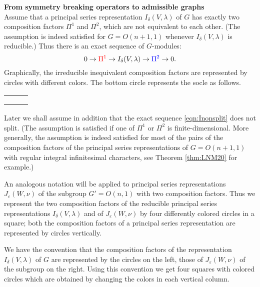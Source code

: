 \medskip
{\bf From symmetry breaking operators to admissible graphs} \\

Assume that a principal series representation $I_{\delta}(V,\lambda)$ of $G$
 has exactly two composition factors $\Pi^1$ and $\Pi^2$, 
 which are not equivalent to each other.  
(The assumption is indeed satisfied for $G=O(n+1,1)$
 whenever $I_{\delta}(V,\lambda)$ is reducible.)
Thus there is an exact sequence of $G$-modules: 
\begin{equation}
  0  \to  {\color{red}\Pi^1}  \to  I_{\delta}(V,\lambda)
     \to {\color{blue}\Pi^2}  \to 0.  
\label{eqn:Inonsplit}
\end{equation}
Graphically,
 the irreducible inequivalent composition factors are represented by circles with different colors. The bottom circle represents the socle
 as follows.  

\begin{center}
	\begin{tabular}{c@{\kern2em}c@{\kern2em}c} 
		\blueO  & &\\
		& &\\
		\redO  & & 
	\end{tabular}
\end{center}
Later we shall assume in addition
 that the exact sequence \eqref{eqn:Inonsplit} does not split. 
(The assumption is satisfied
 if one of $\Pi^1$ or $\Pi^2$ is finite-dimensional.  
More generally,
 the assumption is indeed satisfied 
 for most of the pairs of the composition factors
 of the principal series representations of $G=O(n+1,1)$
 with regular integral infinitesimal characters, 
 see Theorem \ref{thm:LNM20} for example.)


\medskip
An analogous notation will be applied to principal series representations
 $J_{\varepsilon}(W,\nu)$
 of the subgroup $G'=O(n,1)$
 with two composition factors.  
Thus we represent the two composition factors
 of the reducible principal series representations
 $I_\delta(V, \lambda)$ and of $J_\varepsilon(W,\nu)$
 by four differently colored circles
 in a square; both the composition factors
 of a principal series representation are represented by circles vertically. 

We have the convention that the composition factors 
 of the representation $I_\delta(V,\lambda)$ of $G$
 are represented by the circles 
 on the left,
 those of $J_\varepsilon(W,\nu)$ of the subgroup on the right.  
Using this convention we get four squares with colored circles
 which  are obtained by changing the colors in each vertical column.

